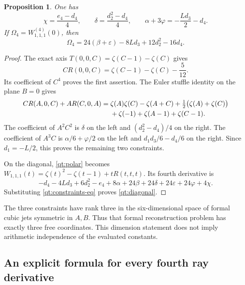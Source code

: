 \documentclass[11pt]{article}
\numberwithin{equation}{section}
\newtheorem{proposition}[theorem]{Proposition}
\theoremstyle{definition}
\theoremstyle{remark}
\begin{document}
\begin{proposition}\label{qt:constraints}
One has
\begin{equation}\label{qt:constraints-eq}
 \chi=\frac{e_4-d_4}{4},\qquad
 \delta=\frac{d_2^2-d_4}{4},\qquad
 \alpha+3\varphi=-\frac{Ld_3}{2}-d_4.
\end{equation}
If $\Omega_4=W_{1,1,1}^{(4)}(0)$, then
\begin{equation}\label{qt:diagonal}
 \boxed{\Omega_4=24(\beta+\varepsilon)-8Ld_3+12d_2^2-16d_4.}
\end{equation}
\end{proposition}
\begin{proof}
The exact axis $T(0,0,C)=\zeta(C-1)-\zeta(C)$ gives
\[
 C R(0,0,C)=\zeta(C-1)-\zeta(C)-\frac5{12}.
\]
Its coefficient of $C^4$ proves the first assertion.
The Euler stuffle identity on the plane $B=0$ gives
\begin{align}\label{qt:stuffle}
 C R(A,0,C)+A R(C,0,A)
 ={}&\zeta(A)\zeta(C)-\zeta(A+C)
 +\tfrac12\bigl(\zeta(A)+\zeta(C)\bigr)\notag\\
 &+\zeta(-1)+\zeta(A-1)+\zeta(C-1).
\end{align}
The coefficient of $A^2C^2$ is $\delta$ on the left and
$(d_2^2-d_4)/4$ on the right. The coefficient of $A^3C$ is
$\alpha/6+\varphi/2$ on the left and
$d_1d_3/6-d_4/6$ on the right. Since $d_1=-L/2$, this proves
the remaining two constraints.

On the diagonal, \eqref{qt:polar} becomes
$W_{1,1,1}(t)=\zeta(t)^2-\zeta(t-1)+tR(t,t,t)$.
Its fourth derivative is
\[
 -d_4-4Ld_3+6d_2^2-e_4
 +8\alpha+24\beta+24\delta+24\varepsilon+24\varphi+4\chi.
\]
Substituting \eqref{qt:constraints-eq} proves \eqref{qt:diagonal}.
\end{proof}

The three constraints have rank three in the six-dimensional space of
formal cubic jets symmetric in $A,B$. Thus that formal reconstruction
problem has exactly three free coordinates. This dimension statement
does not imply arithmetic independence of the evaluated constants.

\subsection{An explicit formula for every fourth ray derivative}
\end{document}
